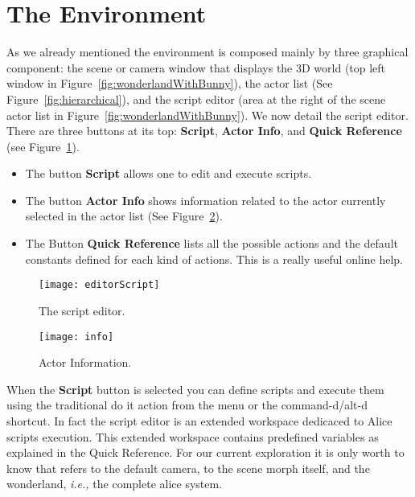 \section{The Environment}
As we already mentioned the environment is composed mainly by three graphical component: the scene or camera window that displays the 3D world (top left window in Figure~\ref{fig:wonderlandWithBunny}), the actor list (See Figure~\ref{fig:hierarchical}), and the script editor (area at the right of the scene actor list in Figure~\ref{fig:wonderlandWithBunny}). We now detail the script editor.
There are  three buttons at its top: \textbf{Script}, \textbf{Actor Info}, and \textbf{Quick Reference} (see Figure~\ref{fig:editorScript}). 

\begin{itemize}
\item The button \textbf{Script} allows one to edit and execute scripts.
\item The button \textbf{Actor Info} shows information related to the actor currently selected in the actor list (See Figure~\ref{fig:info}).
\item The Button \textbf{Quick Reference} lists all the possible actions and the default constants defined 
for each kind of actions. This is a really useful online help.
\end{itemize}

\begin{figure}[h]
\begin{center}\texttt{[image: editorScript]}\end{center}
\caption{The script editor. \label{fig:editorScript}}
\end{figure}

\begin{figure}[h]
\begin{center}\texttt{[image: info]}\end{center}
\caption{Actor Information. \label{fig:info}}
\end{figure}

When the \textbf{Script} button is selected you can define scripts and execute them using the traditional do it action from the menu or the command-d/alt-d shortcut. In fact the script editor is an extended workspace dedicaced to Alice scripts execution. 
This extended workspace contains predefined variables as explained in the Quick Reference.  For our current exploration it is only worth to know that   refers to the default camera,  to the scene morph itself, and  the wonderland, \textit{i.e.,} the complete alice system. 


